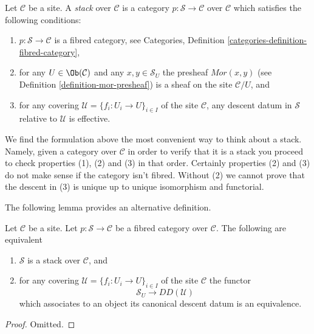\begin{definition}
\label{definition-stack}
Let $\mathcal{C}$ be a site. A {\it stack} over $\mathcal{C}$
is a category $p : \mathcal{S} \to \mathcal{C}$ over $\mathcal{C}$ which
satisfies the following conditions:
\begin{enumerate}
\item $p : \mathcal{S} \to \mathcal{C}$ is a fibred category, see
Categories, Definition \ref{categories-definition-fibred-category},
\item for any $U \in \Ob(\mathcal{C})$ and any $x, y \in \mathcal{S}_U$
the presheaf $\mathit{Mor}(x, y)$ (see
Definition \ref{definition-mor-presheaf}) is a sheaf on
the site $\mathcal{C}/U$, and
\item for any covering $\mathcal{U} = \{f_i : U_i \to U\}_{i \in I}$
of the site $\mathcal{C}$, any descent datum in $\mathcal{S}$
relative to $\mathcal{U}$ is effective.
\end{enumerate}
\end{definition}

\noindent
We find the formulation above the most convenient way to think about
a stack. Namely, given a category over $\mathcal{C}$ in order to verify
that it is a stack you proceed to check properties (1), (2) and
(3) in that order. Certainly properties (2) and (3) do not make sense
if the category isn't fibred. Without (2) we cannot prove that the
descent in (3) is unique up to unique isomorphism and functorial.

\medskip\noindent
The following lemma provides an alternative definition.

\begin{lemma}
\label{lemma-stack-equivalences}
Let $\mathcal{C}$ be a site.
Let $p : \mathcal{S} \to \mathcal{C}$ be a fibred category
over $\mathcal{C}$. The following are equivalent
\begin{enumerate}
\item $\mathcal{S}$ is a stack over $\mathcal{C}$, and
\item for any covering $\mathcal{U} = \{f_i : U_i \to U\}_{i \in I}$
of the site $\mathcal{C}$ the functor
$$
\mathcal{S}_U \longrightarrow DD(\mathcal{U})
$$
which associates to an
object its canonical descent datum is an equivalence.
\end{enumerate}
\end{lemma}

\begin{proof}
Omitted.
\end{proof}

